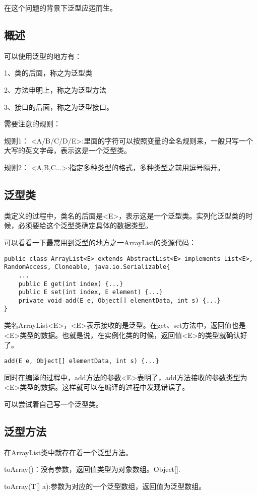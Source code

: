 
在这个问题的背景下泛型应运而生。


\subsection*{概述}
可以使用泛型的地方有：

1、类的后面，称之为泛型类 

2、方法申明上，称之为泛型方法 

3、接口的后面，称之为泛型接口。

需要注意的规则：

规则1：
<A/B/C/D/E>:里面的字符可以按照变量的全名规则来，一般只写一个大写的英文字母，表示这是一个泛型类。

规则2：
<A,B,C...>:指定多种类型的格式，多种类型之前用逗号隔开。

\subsection*{泛型类}

类定义的过程中，类名的后面是<E>，表示这是一个泛型类。实列化泛型类的时候，必须要给这个泛型类确定具体的数据类型。

可以看看一下最常用到泛型的地方之一ArrayList的类源代码：

\begin{lstlisting}[style = Java]
public class ArrayList<E> extends AbstractList<E> implements List<E>, RandomAccess, Cloneable, java.io.Serializable{
    ...
    public E get(int index) {...}
    public E set(int index, E element) {...}
    private void add(E e, Object[] elementData, int s) {...}
}
\end{lstlisting}

类名ArrayList<E>，<E>表示接收的是泛型。在get、set方法中，返回值也是<E>类型的数据。也就是说，在实例化类的时候，返回值<E>的类型就确认好了。

\begin{lstlisting}[style = Java]
    add(E e, Object[] elementData, int s) {...}
\end{lstlisting}

同时在编译的过程中，add方法的参数<E>表明了，add方法接收的参数类型为<E>类型的数据。这样就可以在编译的过程中发现错误了。


可以尝试着自己写一个泛型类。










\subsection*{泛型方法}

在ArrayList类中就存在着一个泛型方法。

toArray()：没有参数，返回值类型为对象数组。Object[].

toArray(T[] a):参数为对应的一个泛型数组，返回值为泛型数组。


